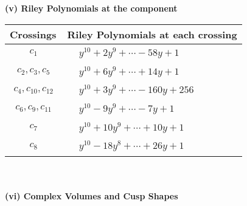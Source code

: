\documentclass[1p]{elsarticle_modified}
\theoremstyle{definition}
\begin{document}
\newpage\renewcommand{\arraystretch}{1}
\flushleft \textbf{(v) Riley Polynomials at the component}\newline \\
\begin{tabular}{m{50pt}|m{274pt}}
Crossings & \hspace{64pt}Riley Polynomials at each crossing \\
\hline $$\begin{aligned}c_{1}\end{aligned}$$&$\begin{aligned}
&y^{10}+2 y^9+\cdots-58 y+1
\end{aligned}$\\
\hline $$\begin{aligned}c_{2},c_{3},c_{5}\end{aligned}$$&$\begin{aligned}
&y^{10}+6 y^9+\cdots+14 y+1
\end{aligned}$\\
\hline $$\begin{aligned}c_{4},c_{10},c_{12}\end{aligned}$$&$\begin{aligned}
&y^{10}+3 y^9+\cdots-160 y+256
\end{aligned}$\\
\hline $$\begin{aligned}c_{6},c_{9},c_{11}\end{aligned}$$&$\begin{aligned}
&y^{10}-9 y^9+\cdots-7 y+1
\end{aligned}$\\
\hline $$\begin{aligned}c_{7}\end{aligned}$$&$\begin{aligned}
&y^{10}+10 y^9+\cdots+10 y+1
\end{aligned}$\\
\hline $$\begin{aligned}c_{8}\end{aligned}$$&$\begin{aligned}
&y^{10}-18 y^8+\cdots+26 y+1
\end{aligned}$\\
\hline
\end{tabular}\\~\\
\newpage\flushleft \textbf{(vi) Complex Volumes and Cusp Shapes}
\end{document}
